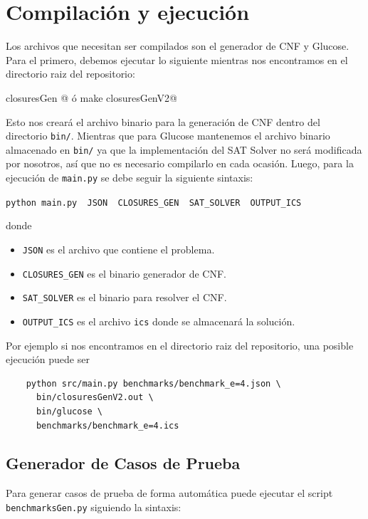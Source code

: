 \documentclass[a4paper,10pt]{article}
\begin{document}
\section{Compilaci\'on y ejecuci\'on}
  Los archivos que necesitan ser compilados son el generador de CNF y Glucose. Para 
  el primero, debemos ejecutar lo siguiente mientras nos encontramos en el directorio 
  raiz del repositorio:

  \begin{center}
    \verb@make closuresGen  @ \'o \verb@  make closuresGenV2@
  \end{center}

  \noindent
  Esto nos crear\'a el archivo binario para la generaci\'on de CNF dentro del directorio 
  \verb|bin/|. Mientras que para Glucose mantenemos el archivo binario almacenado en 
  \verb|bin/| ya que la implementaci\'on del SAT Solver no ser\'a modificada por nosotros,
  as\'i que no es necesario compilarlo en cada ocasi\'on. Luego, para la ejecuci\'on de 
  \verb|main.py| se debe seguir la siguiente sintaxis:

  \begin{center}
    \verb|python main.py  JSON  CLOSURES_GEN  SAT_SOLVER  OUTPUT_ICS|
  \end{center}

  \noindent
  donde 

  \begin{itemize}
    \item \verb|JSON| es el archivo que contiene el problema.
    \item \verb|CLOSURES_GEN| es el binario generador de CNF.
    \item \verb|SAT_SOLVER| es el binario para resolver el CNF. 
    \item \verb|OUTPUT_ICS| es el archivo \verb|ics| donde se almacenar\'a la soluci\'on.
  \end{itemize}

  \noindent
  Por ejemplo si nos encontramos en el directorio raiz del repositorio, una posible ejecuci\'on 
  puede ser 

  \begin{verbatim}
    python src/main.py benchmarks/benchmark_e=4.json \
      bin/closuresGenV2.out \
      bin/glucose \  
      benchmarks/benchmark_e=4.ics
  \end{verbatim}

  \subsection{Generador de Casos de Prueba}
    Para generar casos de prueba de forma autom\'atica puede ejecutar el script 
    \verb|benchmarksGen.py| siguiendo la sintaxis:
\end{document}

